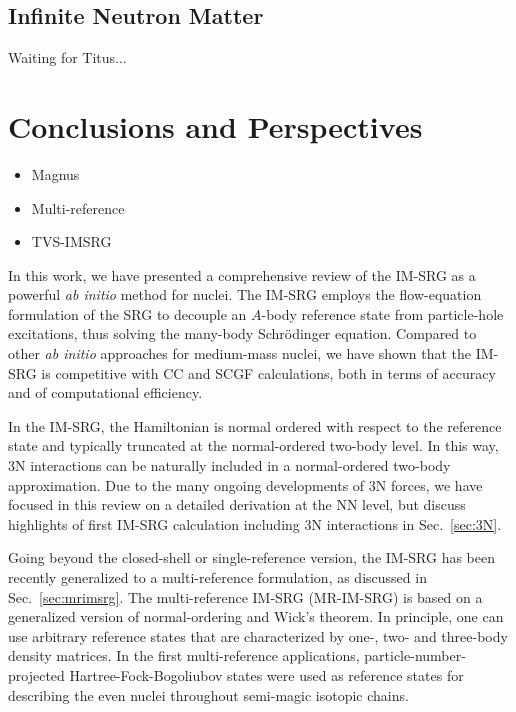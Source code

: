 \subsection{\label{sec:imsrg_neutron_matter}Infinite Neutron Matter}
Waiting for Titus...


\section{\label{sec:perspectives}Conclusions and Perspectives}
\begin{itemize}
\item Magnus
\item Multi-reference
\item TVS-IMSRG
\end{itemize}


In this work, we have presented a comprehensive review of the IM-SRG
as a powerful \emph{ab initio} method for nuclei. The IM-SRG employs
the flow-equation formulation of the SRG to decouple an $A$-body
reference state from particle-hole excitations, thus solving the
many-body Schr\"odinger equation. Compared to other \emph{ab initio}
approaches for medium-mass nuclei, we have shown that the IM-SRG is
competitive with CC and SCGF calculations, both in terms of accuracy and of
computational efficiency.

In the IM-SRG, the Hamiltonian is normal ordered with respect to the
reference state and typically truncated at the normal-ordered two-body
level. In this way, 3N interactions can be naturally included in a
normal-ordered two-body approximation. Due to the many ongoing
developments of 3N forces, we have focused in this review on a
detailed derivation at the NN level, but discuss highlights of first
IM-SRG calculation including 3N interactions in Sec.~\ref{sec:3N}.

Going beyond the closed-shell or single-reference version, the IM-SRG
has been recently generalized to a multi-reference formulation, as
discussed in Sec.~\ref{sec:mrimsrg}. The multi-reference IM-SRG (MR-IM-SRG) is
based on a generalized version of normal-ordering and Wick's
theorem. In principle, one can use 
arbitrary reference states that are
characterized by one-, two- and three-body density matrices. In the
first multi-reference applications, particle-number-projected
Hartree-Fock-Bogoliubov states were used as reference states for
describing the even nuclei throughout semi-magic isotopic chains.

